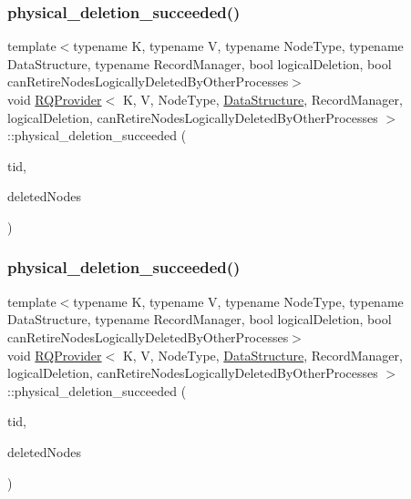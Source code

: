 \mbox{\label{classRQProvider_a1bcce8dc80c1661b549a5ec6f9ee6d15}} 
\subsubsection{\texorpdfstring{physical\+\_\+deletion\+\_\+succeeded()}{physical\_deletion\_succeeded()}\hspace{0.1cm}{\footnotesize\ttfamily [3/5]}}
{\footnotesize\ttfamily template$<$typename K, typename V, typename Node\+Type, typename Data\+Structure, typename Record\+Manager, bool logical\+Deletion, bool can\+Retire\+Nodes\+Logically\+Deleted\+By\+Other\+Processes$>$ \\
void \hyperlink{classRQProvider}{R\+Q\+Provider}$<$ K, V, Node\+Type, \hyperlink{classDataStructure}{Data\+Structure}, Record\+Manager, logical\+Deletion, can\+Retire\+Nodes\+Logically\+Deleted\+By\+Other\+Processes $>$\+::physical\+\_\+deletion\+\_\+succeeded (\begin{DoxyParamCaption}\item[{const int}]{tid,  }\item[{Node\+Type $\ast$const $\ast$const}]{deleted\+Nodes }\end{DoxyParamCaption})\hspace{0.3cm}{\ttfamily [inline]}}

\mbox{\label{classRQProvider_a1bcce8dc80c1661b549a5ec6f9ee6d15}} 
\subsubsection{\texorpdfstring{physical\+\_\+deletion\+\_\+succeeded()}{physical\_deletion\_succeeded()}\hspace{0.1cm}{\footnotesize\ttfamily [4/5]}}
{\footnotesize\ttfamily template$<$typename K, typename V, typename Node\+Type, typename Data\+Structure, typename Record\+Manager, bool logical\+Deletion, bool can\+Retire\+Nodes\+Logically\+Deleted\+By\+Other\+Processes$>$ \\
void \hyperlink{classRQProvider}{R\+Q\+Provider}$<$ K, V, Node\+Type, \hyperlink{classDataStructure}{Data\+Structure}, Record\+Manager, logical\+Deletion, can\+Retire\+Nodes\+Logically\+Deleted\+By\+Other\+Processes $>$\+::physical\+\_\+deletion\+\_\+succeeded (\begin{DoxyParamCaption}\item[{const int}]{tid,  }\item[{Node\+Type $\ast$const $\ast$const}]{deleted\+Nodes }\end{DoxyParamCaption})\hspace{0.3cm}{\ttfamily [inline]}}

